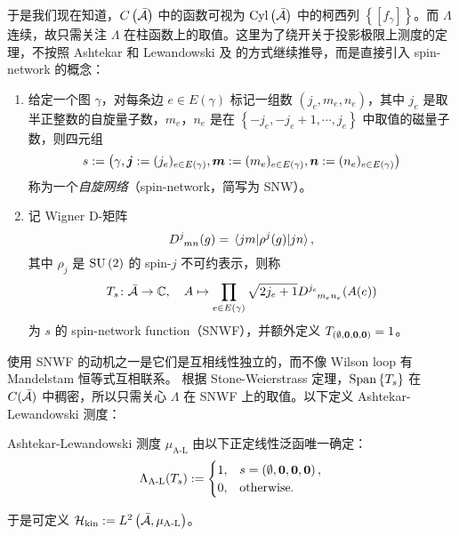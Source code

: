 			于是我们现在知道，$C\left(\bar{\mathcal{A}}\right)$ 中的函数可视为 $\mathrm{Cyl}\left(\bar{\mathcal{A}}\right)$ 中的柯西列 $\left\{ [f_\gamma] \right\}$。而 $\Lambda$ 连续，故只需关注 $\Lambda$ 在柱函数上的取值。这里为了绕开关于投影极限上测度的定理，不按照 Ashtekar 和 Lewandowski \cite{Ashtekar1994} 及 \cite{Thiemann2007} 的方式继续推导，而是直接引入 spin-network 的概念：
			\begin{Definition}
				\begin{enumerate}
					\item 给定一个图 $\gamma$，对每条边 $e\in E(\gamma)$ 标记一组数 $\left(j_e,m_e,n_e\right)$，其中 $j_e$ 是取半正整数的自旋量子数，$m_e$，$n_e$ 是在 $\left\{ -j_e, -j_e+1, \cdots , j_e \right\}$ 中取值的磁量子数，则四元组
					\begin{equation}
						s := \left( \gamma, \vb*{j} := (j_e)_{e\in E(\gamma)}, \vb*{m} := (m_e)_{e\in E(\gamma)}, \vb*{n} := (n_e)_{e\in E(\gamma)} \right)
					\end{equation}
					称为一个\emph{自旋网络}（spin-network，简写为 SNW）。
					\item 记 Wigner D-矩阵
					\begin{equation}
						\tensor{D}{^j_m_n}(g) = \mel{jm}{\rho^j(g)}{jn},
					\end{equation}
					其中 $\rho_j$ 是 $\mathrm{SU}\left(2\right)$ 的 spin-$j$ 不可约表示，则称
					\begin{equation}
						T_s \colon \bar{\configurationspace{A}} \rightarrow \mathbb{C} \qc A \mapsto \prod_{e\in E(\gamma)} \sqrt{2j_e + 1} \tensor{D}{^{j_e}_{m_e}_{n_e}}(A(e))
					\end{equation}
					为 $s$ 的 spin-network function（SNWF），并额外定义 $T_{(\emptyset, \vb*{0},\vb*{0},\vb*{0})} = 1$。
				\end{enumerate}
			\end{Definition}
			使用 SNWF 的动机之一是它们是互相线性独立的，而不像 Wilson loop 有 Mandelstam 恒等式互相联系。%
			根据 Stone-Weierstrass 定理，$\operatorname{Span}\left\{ T_s \right\}$ 在 $C(\bar{\mathcal{A}})$ 中稠密，所以只需关心 $\Lambda$ 在 SNWF 上的取值。以下定义 Ashtekar-Lewandowski 测度：
			\begin{Definition}
				Ashtekar-Lewandowski 测度 $\mu_{\text{A-L}}$ 由以下正定线性泛函唯一确定：
				\begin{equation}
					\Lambda_{\text{A-L}}(T_s) :=
					\begin{cases}
						1, & s=\left(\emptyset,\vb*{0},\vb*{0},\vb*{0}\right),\\
						0, & \text{otherwise}.
					\end{cases}
				\end{equation}
			\end{Definition}
			于是可定义 $\mathcal{H}_{\text{kin}} := L^2\left(\bar{\mathcal{A}},\mu_{\text{A-L}}\right)$。

